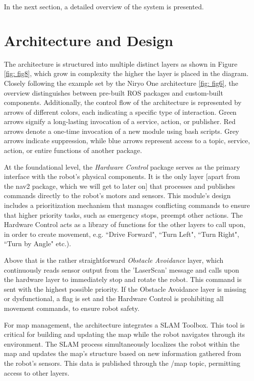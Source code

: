 \documentclass[%
paper=A4,               %
twoside=true,           %
openright,              %
11pt,                   %
bibliography=totoc,     %
titlepage=on,           %
DIV=12,                 %
BCOR=1.5cm,             %
parskip=half,            %
final
]{scrreprt}
\begin{document}
	 In the next section, a detailed overview of the system is presented. 
	 
	 
	 
	\section{Architecture and Design}
	
	The architecture is structured into multiple distinct layers as shown in Figure \ref{fig: fig8}, which grow in complexity the higher the layer is placed in the diagram. Closely following the example set by the Niryo One architecture \ref{fig: fig6}, the overview distinguishes between pre-built ROS packages and custom-built components. Additionally, the control flow of the architecture is represented by arrows of different colors, each indicating a specific type of interaction. Green arrows signify a long-lasting invocation of a service, action, or publisher. Red arrows denote a one-time invocation of a new module using bash scripts. Grey arrows indicate suppression, while blue arrows represent access to a topic, service, action, or entire functions of another package.
			
	At the foundational level, the \textit{Hardware Control} package serves as the primary interface with the robot's physical components. It is the only layer [apart from the nav2 package, which we will get to later on] that processes and publishes commands directly to the robot's motors and sensors. This module's design includes a prioritization mechanism that manages conflicting commands to ensure that higher priority tasks, such as emergency stops, preempt other actions. The Hardware Control acts as a library of functions for the other layers to call upon, in order to create movement, e.g. ``Drive Forward", ``Turn Left", ``Turn Right", ``Turn by Angle" etc.). 
		
	Above that is the rather straightforward \textit{Obstacle Avoidance} layer, which continuously reads sensor output from the 'LaserScan' message \autocite{ros.orgLaserScanMessage2024a} and calls upon the hardware layer to immediately stop and rotate the robot. This command is sent with the highest possible priority. If the Obstacle Avoidance layer is missing or dysfunctional, a flag is set and the Hardware Control is prohibiting all movement commands, to ensure robot safety. 
	
	For map management, the architecture integrates a SLAM Toolbox. This tool is critical for building and updating the map while the robot navigates through its environment. The SLAM process simultaneously localizes the robot within the map and updates the map's structure based on new information gathered from the robot's sensors. This data is published through the /map topic, permitting access to other layers.
	
\end{document}
